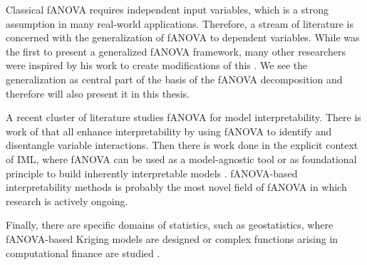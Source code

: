 Classical fANOVA requires independent input variables, which is a strong assumption in many real‑world applications. Therefore, a stream of literature is concerned with the generalization of fANOVA to dependent variables.
While \cite{hooker2007} was the first to present a generalized fANOVA framework, many other researchers were inspired by his work to create modifications of this \cite{rahman2014,chastaing2012,ilidrissi2025}.
We see the generalization as central part of the basis of the fANOVA decomposition and therefore will also present it in this thesis.\par

A recent cluster of literature studies fANOVA for model interpretability. There is work of \cite{lengerich2020, konig2024, choi2025} that all enhance interpretability by using fANOVA to identify and disentangle variable interactions.
Then there is work done in the explicit context of IML, where fANOVA can be used as a model-agnostic tool \citep{hooker2004,fumagalli2025} or as foundational principle to build inherently interpretable models \citep{hu2025}. fANOVA-based interpretability methods is probably the most novel field of fANOVA in which research is actively ongoing.\par

Finally, there are specific domains of statistics, such as geostatistics, where fANOVA-based Kriging models are designed \citep{muehlenstaedt2012} or
complex functions arising in computational finance are studied \citep{liu2006}.







